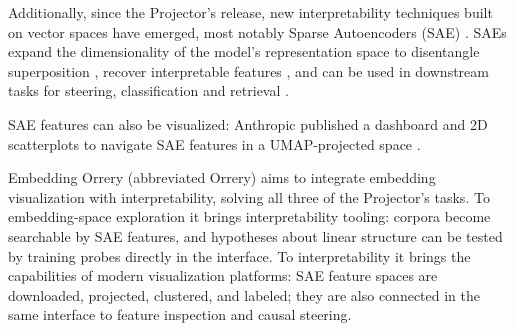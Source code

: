 \documentclass[11pt]{article}
\begin{document}
Additionally, since the Projector's release, new interpretability techniques built on vector spaces have emerged, most notably Sparse Autoencoders (SAE) \cite{bricken2023monosemanticity}. SAEs expand the dimensionality of the model's representation space to disentangle superposition \cite{elhage2022superposition}, recover interpretable features \cite{templeton2024scaling}, and can be used in downstream tasks for steering, classification and retrieval \cite{jiang2025interpretableembeddingssparseautoencoders,
deng2026qwenscopeturningsparsefeatures}. 


SAE features can also be visualized: Anthropic published a dashboard and 2D scatterplots to navigate SAE features in a UMAP-projected space \cite{bricken2023monosemanticity, templeton2024scaling}.



Embedding Orrery (abbreviated Orrery) aims to integrate embedding visualization with interpretability, solving all three of the Projector's tasks. To embedding-space exploration it brings interpretability tooling: corpora become searchable by SAE features, and hypotheses about linear structure can be tested by training probes directly in the interface. To interpretability it brings the capabilities of modern visualization platforms: SAE feature spaces are downloaded, projected, clustered, and labeled; they are also connected in the same interface to feature inspection and causal steering.



\end{document}
